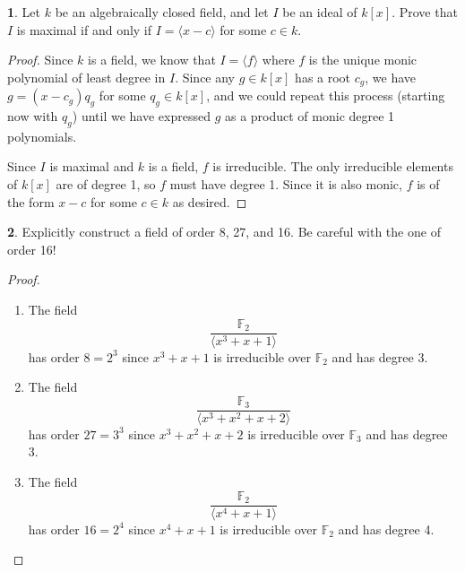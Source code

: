 \documentclass[12pt]{article}
\theoremstyle{definition}
\newtheorem{ex}{}
\begin{document}
\begin{ex}
	Let $k$ be an algebraically closed field, and let $I$ be an ideal of $k[x]$.
	Prove that $I$ is maximal if and only if $I = \langle x - c \rangle$ for some $c \in k$.
\end{ex}
\begin{proof}
	Since $k$ is a field, we know that $I = \langle f \rangle$ where $f$ is the unique monic polynomial of least degree in $I$.
	Since any $g \in k[x]$ has a root $c_g$, we have $g = (x-c_g)q_g$ for some $q_g \in k[x]$, and we could repeat this process (starting now with $q_g$) until we have expressed $g$ as a product of monic degree 1 polynomials.

	Since $I$ is maximal and $k$ is a field, $f$ is irreducible.
	The only irreducible elements of $k[x]$ are of degree 1, so $f$ must have degree 1.
	Since it is also monic, $f$ is of the form $x - c$ for some $c \in k$ as desired.
\end{proof}

\begin{ex}
	Explicitly construct a field of order 8, 27, and 16.
	Be careful with the one of order 16!
\end{ex}
\begin{proof}\
	\begin{enumerate}
		\item The field \begin{equation*}
			      \frac{\mathbb{F}_2}{\langle x^3 + x + 1 \rangle}
		      \end{equation*}
		      has order $8 = 2^3$ since $x^3 + x + 1$ is irreducible over $\mathbb{F}_2$ and has degree 3.
		\item The field \begin{equation*}
			      \frac{\mathbb{F}_3}{\langle x^3 + x^2 + x + 2 \rangle}
		      \end{equation*}
		      has order $27 = 3^3$ since $x^3 + x^2 + x + 2$ is irreducible over $\mathbb{F}_3$ and has degree 3.
		\item The field \begin{equation*}
			      \frac{\mathbb{F}_2}{\langle x^4 + x + 1 \rangle}
		      \end{equation*}
		      has order $16 = 2^4$ since $x^4 + x + 1$ is irreducible over $\mathbb{F}_2$ and has degree 4.
	\end{enumerate}
\end{proof}
\end{document}

